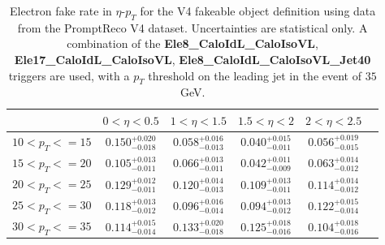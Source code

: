 \begin{table}[!htbp]
\begin{center}
\begin{tabular}{|c|c|c|c|c|c|}

\hline
                       &        $0<\eta<0.5$              &        $1<\eta<1.5$              &        $1.5<\eta<2$              &        $2<\eta<2.5$               \\
\hline
    $10 < p_{T} <= 15$ &        $0.150^{+0.020}_{-0.018}$ &        $0.058^{+0.016}_{-0.013}$ &        $0.040^{+0.015}_{-0.011}$ &        $0.056^{+0.019}_{-0.015}$  \\ 
 \hline
    $15 < p_{T} <= 20$ &        $0.105^{+0.013}_{-0.011}$ &        $0.066^{+0.013}_{-0.011}$ &        $0.042^{+0.011}_{-0.009}$ &        $0.063^{+0.014}_{-0.012}$  \\ 
 \hline
    $20 < p_{T} <= 25$ &        $0.129^{+0.012}_{-0.011}$ &        $0.120^{+0.014}_{-0.013}$ &        $0.109^{+0.013}_{-0.011}$ &        $0.114^{+0.014}_{-0.012}$  \\ 
 \hline
    $25 < p_{T} <= 30$ &        $0.118^{+0.013}_{-0.012}$ &        $0.096^{+0.016}_{-0.014}$ &        $0.094^{+0.013}_{-0.012}$ &        $0.122^{+0.015}_{-0.014}$  \\ 
 \hline
    $30 < p_{T} <= 35$ &        $0.114^{+0.015}_{-0.014}$ &        $0.133^{+0.020}_{-0.018}$ &        $0.125^{+0.018}_{-0.016}$ &        $0.104^{+0.018}_{-0.016}$  \\ 
 \hline

\end{tabular}
\caption{Electron fake rate in $\eta$-$p_T$ for the V4 fakeable object definition using data from the PromptReco V4 dataset. 
Uncertainties are statistical only. A combination of the {\bf Ele8\_CaloIdL\_CaloIsoVL}, {\bf Ele17\_CaloIdL\_CaloIsoVL}, 
{\bf Ele8\_CaloIdL\_CaloIsoVL\_Jet40} triggers are used, with a $p_{T}$ threshold on the leading jet in
the event of $35$ GeV. }
\label{tab:ele_fr_V4_jet35_prv4}
\end{center}
\end{table}

